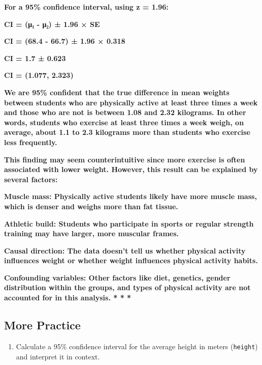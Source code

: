 \documentclass[
]{article}
\providecommand{\tightlist}{%
  \setlength{\itemsep}{0pt}\setlength{\parskip}{0pt}}
\begin{document}
\textbf{For a 95\% confidence interval, using z = 1.96:}

\textbf{CI = (μ₁ - μ₂) ± 1.96 × SE}

\textbf{CI = (68.4 - 66.7) ± 1.96 × 0.318}

\textbf{CI = 1.7 ± 0.623}

\textbf{CI = (1.077, 2.323)}

\textbf{We are 95\% confident that the true difference in mean weights
between students who are physically active at least three times a week
and those who are not is between 1.08 and 2.32 kilograms. In other
words, students who exercise at least three times a week weigh, on
average, about 1.1 to 2.3 kilograms more than students who exercise less
frequently.}

\textbf{This finding may seem counterintuitive since more exercise is
often associated with lower weight. However, this result can be
explained by several factors:}

\textbf{Muscle mass: Physically active students likely have more muscle
mass, which is denser and weighs more than fat tissue.}

\textbf{Athletic build: Students who participate in sports or regular
strength training may have larger, more muscular frames.}

\textbf{Causal direction: The data doesn't tell us whether physical
activity influences weight or whether weight influences physical
activity habits.}

\textbf{Confounding variables: Other factors like diet, genetics, gender
distribution within the groups, and types of physical activity are not
accounted for in this analysis. * * *}

\subsection{More Practice}\label{more-practice}

\begin{enumerate}
\def\labelenumi{\arabic{enumi}.}
\setcounter{enumi}{7}
\tightlist
\item
  Calculate a 95\% confidence interval for the average height in meters
  (\texttt{height}) and interpret it in context.
\end{enumerate}
\end{document}
